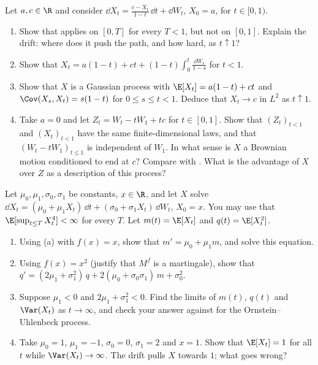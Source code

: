 \begin{exercise}\label{ex:sde-bridge}
\medium Let $a,c\in\R$ and consider
$\dd X_t=\frac{c-X_t}{1-t}\,\dd t+\dd W_t$, $X_0=a$, for $t\in[0,1)$.
\begin{enumerate}[label=(\alph*)]
  \item Show that  applies on $[0,T]$ for every $T<1$, but not on
    $[0,1]$. Explain the drift: where does it push the path, and how hard, as $t\uparrow1$?
  \item Show that $X_t=a(1-t)+ct+(1-t)\int_0^t\frac{\dd W_s}{1-s}$ for $t<1$.
  \item Show that $X$ is a Gaussian process with $\E[X_t]=a(1-t)+ct$ and
    $\Cov(X_s,X_t)=s(1-t)$ for $0\le s\le t<1$. Deduce that $X_t\to c$ in $L^2$ as $t\uparrow1$.
  \item Take $a=0$ and let $Z_t=W_t-tW_1+tc$ for $t\in[0,1]$. Show that $(Z_t)_{t<1}$ and
    $(X_t)_{t<1}$ have the same finite-dimensional laws, and that $(W_t-tW_1)_{t\le1}$ is
    independent of $W_1$. In what sense is $X$ a Brownian motion conditioned to end at $c$?
    Compare with . What is the advantage of $X$ over $Z$ as a description
    of this process?
\end{enumerate}
\end{exercise}

\begin{exercise}\label{ex:sde-moments}
\medium Let $\mu_0,\mu_1,\sigma_0,\sigma_1$ be constants, $x\in\R$, and let $X$ solve
$\dd X_t=(\mu_0+\mu_1X_t)\,\dd t+(\sigma_0+\sigma_1X_t)\,\dd W_t$, $X_0=x$. You may use that
$\E[\sup_{t\le T}X_t^4]<\infty$ for every $T$. Let $m(t)=\E[X_t]$ and $q(t)=\E[X_t^2]$.
\begin{enumerate}[label=(\alph*)]
  \item Using (a) with $f(x)=x$, show that $m'=\mu_0+\mu_1m$, and
    solve this equation.
  \item Using $f(x)=x^2$ (justify that $M^f$ is a martingale), show that
    $q'=(2\mu_1+\sigma_1^2)\,q+2(\mu_0+\sigma_0\sigma_1)\,m+\sigma_0^2$.
  \item Suppose $\mu_1<0$ and $2\mu_1+\sigma_1^2<0$. Find the limits of $m(t)$, $q(t)$ and
    $\Var(X_t)$ as $t\to\infty$, and check your answer against  for the
    Ornstein--Uhlenbeck process.
  \item Take $\mu_0=1$, $\mu_1=-1$, $\sigma_0=0$, $\sigma_1=2$ and $x=1$. Show that
    $\E[X_t]=1$ for all $t$ while $\Var(X_t)\to\infty$. The drift pulls $X$ towards $1$; what
    goes wrong?
\end{enumerate}
\end{exercise}


